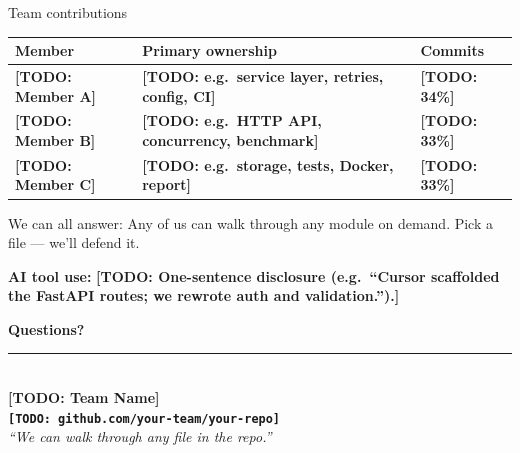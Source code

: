 \documentclass[aspectratio=169,11pt]{beamer}
\newcommand{\teamname}{\TODO{Team Name}}
\newcommand{\memberone}{\TODO{Member A}}
\newcommand{\membertwo}{\TODO{Member B}}
\newcommand{\memberthree}{\TODO{Member C}}
\newcommand{\repolink}{\TODO{github.com/your-team/your-repo}}
\newcommand{\TODO}[1]{\textcolor{accent2}{\textbf{[TODO: #1]}}}
\begin{document}
\begin{frame}{Team contributions}
  \begin{center}\small
  \begin{tabularx}{\linewidth}{lXl}
    \toprule
    \textbf{Member} & \textbf{Primary ownership} & \textbf{Commits} \\
    \midrule
    \memberone   & \TODO{e.g.\ service layer, retries, config, CI}   & \TODO{34\%} \\
    \membertwo   & \TODO{e.g.\ HTTP API, concurrency, benchmark}    & \TODO{33\%} \\
    \memberthree & \TODO{e.g.\ storage, tests, Docker, report}      & \TODO{33\%} \\
    \bottomrule
  \end{tabularx}
  \end{center}

  \vspace{0.4em}
  \begin{block}{We can all answer:}
    Any of us can walk through any module on demand. Pick a file --- we'll defend it.
  \end{block}

  \vspace{0.4em}
  \textbf{AI tool use:} \TODO{One-sentence disclosure (e.g.\ ``Cursor scaffolded the FastAPI routes; we rewrote auth and validation.'').}
\end{frame}

{%
\begin{frame}[plain]
  \begin{center}
    \vspace{1cm}
    {\Huge\bfseries\color{accent} Questions?}\\[1.2em]
    \rule{0.5\textwidth}{0.6pt}\\[1.2em]
    {\large \teamname}\\[0.6em]
    {\normalsize \texttt{\repolink}}\\[1cm]
    {\footnotesize\itshape ``We can walk through any file in the repo.''}
  \end{center}
\end{frame}
}
\end{document}
